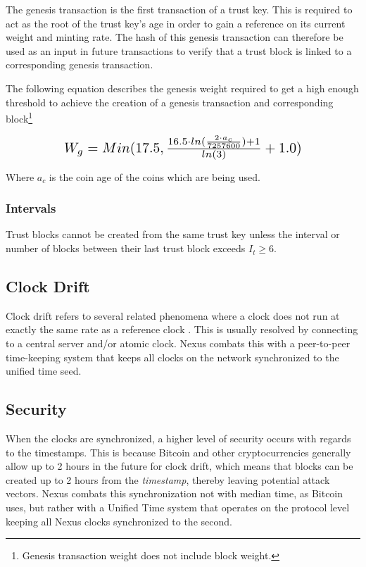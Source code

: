 \documentclass[11pt]{article}
\begin{document}
The genesis transaction is the first transaction of a trust key. 
This is required to act as the root of the trust key's age in order to gain a reference on its current weight and minting rate. 
The hash of this genesis transaction can therefore be used as an input in future transactions to verify that a trust block is linked to a corresponding genesis transaction.

\noindent The following equation describes the genesis weight required to get a high enough threshold to achieve the creation of a genesis transaction and corresponding block\footnote{Genesis transaction weight does not include block weight.}

\begin{equation}
\resizebox{.70\hsize}{!}{$
W_{g} = Min(17.5, \frac{16.5 \cdot ln(\frac{2 \cdot a_{c}}{7257600}) + 1}{ln(3)} + 1.0)
$}
\end{equation}

\noindent Where $a_c$ is the coin age of the coins which are being used.

\subsubsection{Intervals}
 
Trust blocks cannot be created from the same trust key unless the interval or number of blocks between their last trust block exceeds $I_{t} \geq 6$.

\subsection{Clock Drift}

Clock drift refers to several related phenomena where a clock does not run at exactly the same rate as a reference clock \cite{wikiclockdrift}.
This is usually resolved by connecting to a central server and/or atomic clock.
Nexus combats this with a peer-to-peer time-keeping system that keeps all clocks on the network synchronized to the unified time seed.

\subsection{Security}

When the clocks are synchronized, a higher level of security occurs with regards to the timestamps. 
This is because Bitcoin and other cryptocurrencies generally allow up to 2 hours in the future for clock drift, which means that blocks can be created up to 2 hours from the \textit{timestamp}, thereby leaving potential attack vectors.
Nexus combats this synchronization not with median time, as Bitcoin uses, but rather with a Unified Time system that operates on the protocol level keeping all Nexus clocks synchronized to the second.
\end{document}
